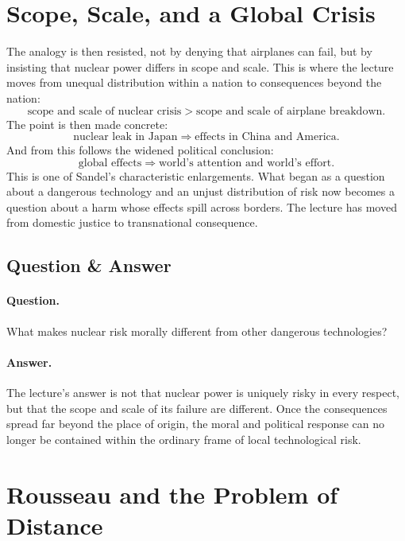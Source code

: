 \section{Scope, Scale, and a Global Crisis}

The analogy is then resisted, not by denying that airplanes can fail, but by insisting that nuclear power differs in scope and scale. This is where the lecture moves from unequal distribution within a nation to consequences beyond the nation:
\begin{equation}
\text{scope and scale of nuclear crisis}
>
\text{scope and scale of airplane breakdown}.
\end{equation}
The point is then made concrete:
\begin{equation}
\text{nuclear leak in Japan}
\Longrightarrow
\text{effects in China and America}.
\end{equation}
And from this follows the widened political conclusion:
\begin{equation}
\text{global effects}
\Longrightarrow
\text{world's attention and world's effort}.
\end{equation}
This is one of Sandel's characteristic enlargements. What began as a question about a dangerous technology and an unjust distribution of risk now becomes a question about a harm whose effects spill across borders. The lecture has moved from domestic justice to transnational consequence.

\subsection{Question \& Answer}

\paragraph{Question.} What makes nuclear risk morally different from other dangerous technologies?

\paragraph{Answer.} The lecture's answer is not that nuclear power is uniquely risky in every respect, but that the scope and scale of its failure are different. Once the consequences spread far beyond the place of origin, the moral and political response can no longer be contained within the ordinary frame of local technological risk.

\section{Rousseau and the Problem of Distance}

